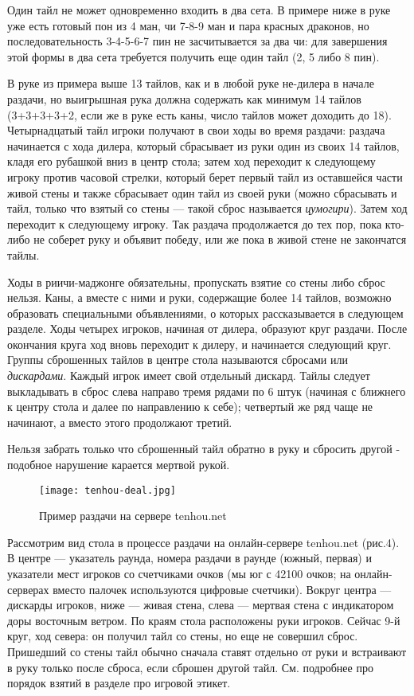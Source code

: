 Один тайл не может одновременно входить в два сета. В примере ниже в руке уже есть готовый пон из 4 ман, чи 7-8-9 ман и пара красных драконов, но последовательность 3-4-5-6-7 пин не засчитывается за два чи: для завершения этой формы в два сета требуется получить еще один тайл (2, 5 либо 8 пин).


В руке из примера выше 13 тайлов, как и в любой руке не-дилера в начале раздачи, но выигрышная рука должна содержать как минимум 14 тайлов (3+3+3+3+2, если же в руке есть каны, число тайлов может доходить до 18). Четырнадцатый тайл игроки получают в свои ходы во время раздачи: раздача начинается с хода дилера, который сбрасывает из руки один из своих 14 тайлов, кладя его рубашкой вниз в центр стола; затем ход переходит к следующему игроку против часовой стрелки, который берет первый тайл из оставшейся части живой стены и также сбрасывает один тайл из своей руки (можно сбрасывать и тайл, только что взятый со стены --- такой сброс называется \textit{цумогири}). Затем ход переходит к следующему игроку. Так раздача продолжается до тех пор, пока кто-либо не соберет руку и объявит победу, или же пока в живой стене не закончатся тайлы. 

Ходы в риичи-маджонге обязательны, пропускать взятие со стены либо сброс нельзя. Каны, а вместе с ними и руки, содержащие более 14 тайлов, возможно образовать специальными объявлениями, о которых рассказывается в следующем разделе. Ходы четырех игроков, начиная от дилера, образуют круг раздачи. После окончания круга ход вновь переходит к дилеру, и начинается следующий круг. Группы сброшенных тайлов в центре стола называются сбросами или \textit{дискардами}. Каждый игрок имеет свой отдельный дискард. Тайлы следует выкладывать в сброс слева направо тремя рядами по 6 штук (начиная с ближнего к центру стола и далее по направлению к себе); четвертый же ряд чаще не начинают, а вместо этого продолжают третий.

Нельзя забрать только что сброшенный тайл обратно в руку и сбросить другой - подобное нарушение карается мертвой рукой.

\begin{figure}[H]
	\centering
	\texttt{[image: tenhou-deal.jpg]}
	\caption{Пример раздачи на сервере tenhou.net}
\end{figure}

Рассмотрим вид стола в процессе раздачи на онлайн-сервере tenhou.net (рис.4). В центре --- указатель раунда, номера раздачи в раунде (южный, первая) и указатели мест игроков со счетчиками очков (мы юг с 42100 очков; на онлайн-серверах вместо палочек используются цифровые счетчики). Вокруг центра --- дискарды игроков, ниже --- живая стена, слева --- мертвая стена с индикатором доры восточным ветром. По краям стола расположены руки игроков. Сейчас 9-й круг, ход севера: он получил тайл со стены, но еще не совершил сброс. Пришедший со стены тайл обычно сначала ставят отдельно от руки и встраивают в руку только после сброса, если сброшен другой тайл. См. подробнее про порядок взятий в разделе про игровой этикет.

